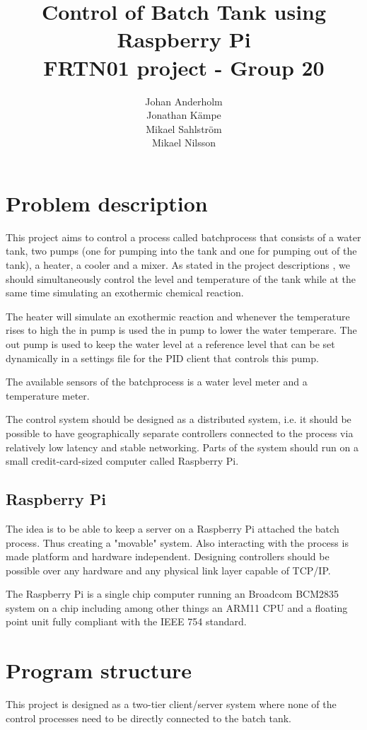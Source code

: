 \documentclass{article}
\title{Control of Batch Tank using Raspberry Pi \\ FRTN01 project - Group 20}
\author{Johan Anderholm \\ Jonathan Kämpe \\ Mikael Sahlström \\ Mikael Nilsson}
\begin{document}
\maketitle
\newpage
\tableofcontents
\newpage
\section{Problem description}
This project aims to control a process called batchprocess that consists
of a water tank, two pumps (one for pumping into the tank and one for
pumping out of the tank), a heater, a cooler and a mixer. As stated in
the project descriptions \cite[p.~6]{project12}, we should
simultaneously control the level and temperature of the tank while at
the same time simulating an exothermic chemical reaction.

The heater will simulate an exothermic reaction and whenever the
temperature rises to high the in pump is used the in pump to lower the
water temperare. The out pump is used to keep the water level at a
reference level that can be set dynamically in a settings file for the
PID client that controls this pump.

The available sensors of the batchprocess is a water level meter and a
temperature meter.

The control system should be designed as a distributed system, i.e. it
should be possible to have geographically separate controllers connected
to the process via relatively low latency and stable networking. Parts
of the system should run on a small credit-card-sized computer called
Raspberry Pi.

\subsection{Raspberry Pi}
The idea is to be able to keep a server on a Raspberry Pi attached the
batch process. Thus creating a "movable" system. Also interacting with
the process is made platform and hardware independent. Designing
controllers should be possible over any hardware and any physical link
layer capable of TCP/IP.

The Raspberry Pi is a single chip computer running an Broadcom BCM2835
system on a chip including among other things an ARM11 CPU and a
floating point unit fully compliant with the IEEE 754 standard.


\section{Program structure}
This project is designed as a two-tier client/server system 
\cite[p.~6]{clientserver} where none of the control processes need to be directly
connected to the batch tank.
\end{document}
